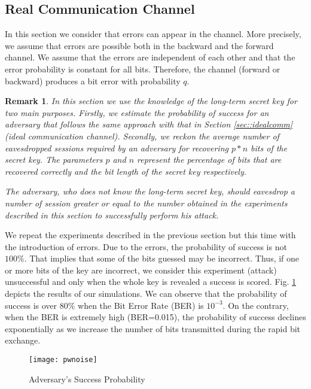 \documentclass{article}
\newtheorem{remark}{Remark}
\begin{document}
\subsection{Real Communication Channel}

In this section we consider that errors can appear in the channel. More precisely, we assume that errors are possible both in the backward and the forward channel. We assume that the errors are independent of each other and that the error probability is constant for all bits. Therefore,  the channel (forward or backward) produces a bit error with probability  $q$.

\begin{remark}
In this section we use the knowledge of the long-term secret key for two main purposes.  Firstly, we estimate the probability of success for an adversary that follows the same approach with that in Section \ref{sec::idealcomm} (ideal communication channel). Secondly, we reckon the average number of eavesdropped sessions required by an adversary for recovering $p*n$ bits of the secret key. The parameters $p$ and $n$ represent the percentage of bits that are recovered correctly and the bit length of the secret key respectively.

The adversary, who does not know the long-term secret key, should eavesdrop a number of session greater or equal to the number obtained in the experiments described in this section to successfully perform his attack.

\end{remark}

We repeat the experiments described in the previous section but this time with the introduction of errors. Due to the errors, the probability of success is not $100\%$. That implies that some of the bits guessed may be incorrect.  Thus, if one or more bits of the key are incorrect, we consider this experiment (attack) unsuccessful and only when the whole key is revealed a success is scored.  Fig. \ref{fig::fig3} depicts the results of our simulations.  We can observe that the probability of success is over $80\%$ when the Bit Error Rate (BER) is $10^{-3}$.  On the contrary, when the BER is extremely high (BER=0.015), the probability of success declines exponentially as we increase the number of bits transmitted during the rapid bit exchange.

\begin{figure}
\centering
\texttt{[image: pwnoise]}\\
  \caption{Adversary's Success Probability}\label{fig::fig3}
\end{figure}
\end{document}
